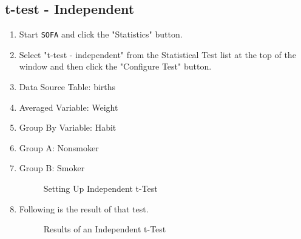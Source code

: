 \subsection{t-test - Independent}

\begin{enumerate}
  \item Start \texttt{SOFA} and click the "Statistics" button.
  \item Select "t-test - independent" from the Statistical Test list at the top of the window and then click the "Configure Test" button.
  \item Data Source Table: births
  \item Averaged Variable: Weight
  \item Group By Variable: Habit
  \item Group A: Nonsmoker
  \item Group B: Smoker
  
  \begin{figure}[H]
    \begin{center}
      \caption{Setting Up Independent t-Test}
    \end{center}
  \end{figure}
  
  \item Following is the result of that test.
  
  \begin{figure}[H]
    \begin{center}
      \caption{Results of an Independent t-Test}
    \end{center}
  \end{figure}
  

\end{enumerate}
